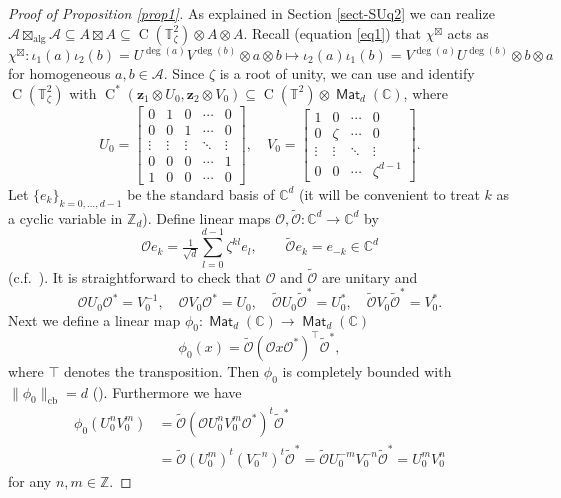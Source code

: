 \documentclass[12pt,reqno,a4paper]{amsart}
\theoremstyle{definition}
\newcommand{\tens}{\otimes}
\newcommand{\algboxtimes}{\boxtimes_{\textrm{alg}}}
\newcommand{\CC}{\mathbb{C}}
\newcommand{\TT}{\mathbb{T}}
\newcommand{\ZZ}{\mathbb{Z}}
\newcommand{\cA}{\mathscr{A}}
\newcommand{\bz}{{\boldsymbol{z}}}
\DeclareMathOperator{\C}{C}
\DeclareMathOperator{\Mat}{\mathsf{Mat}}
\DeclareMathOperator{\cb}{cb}
\numberwithin{equation}{section}
\begin{document}
\begin{appendices}
\begin{proof}[Proof of Proposition \ref{prop1}]
As explained in Section \ref{sect-SUq2} we can realize $\cA\algboxtimes\cA\subseteq A\boxtimes A\subseteq\C(\TT^2_\zeta)\tens A\tens A$. Recall (equation \eqref{eq1}) that $\chi^\boxtimes$ acts as
\[
\chi^\boxtimes\colon\iota_1(a)\iota_2(b)
=U^{\deg(a)}V^{\deg(b)}\tens a\tens b\longmapsto\iota_2(a)\iota_1(b)
=V^{\deg(a)}U^{\deg(b)}\tens b\tens a
\]
for homogeneous $a,b\in\cA$. Since $\zeta$ is a root of unity, we can use \cite[Corollary 1.12]{Boca} and identify $\C(\TT^2_\zeta)$ with $\C^*(\bz_1\tens U_0,\bz_2\tens V_0)\subseteq\C(\TT^2)\tens\Mat_d(\CC)$, where
\[
U_0=\begin{bmatrix}
0 & 1 & 0 & \cdots & 0\\
0 & 0 & 1 & \cdots & 0 \\
\vdots & \vdots & \vdots &
\ddots & \vdots\\
0 & 0 & 0 & \cdots & 1 \\
1 & 0 & 0 & \cdots & 0
\end{bmatrix},\quad
V_0=\begin{bmatrix}
1 & 0 & \cdots & 0\\
0 & \zeta & \cdots & 0 \\
\vdots & \vdots & \ddots & \vdots\\
0 & 0 & \cdots & \zeta^{d-1}
\end{bmatrix}.
\]
Let $\{e_k\}_{k=0,\dotsc,d-1}$ be the standard basis of $\CC^d$ (it will be convenient to treat $k$ as a cyclic variable in $\ZZ_d$). Define linear maps $\mathcal{O},\widetilde{\mathcal{O}}\colon\CC^d\to\CC^d$ by
\[
\mathcal{O}e_k=\tfrac{1}{\sqrt{d}}\sum_{l=0}^{d-1}\zeta^{k l}e_l,\qquad
\widetilde{\mathcal{O}}e_k=e_{-k}\in\CC^d
\]
(c.f.~\cite[Equation (1.11)]{Boca}). It is straightforward to check that $\mathcal{O}$ and $\widetilde{\mathcal{O}}$ are unitary and
\[
\mathcal{O} U_0 \mathcal{O}^*=V_0^{-1},\quad
\mathcal{O}V_0 \mathcal{O}^*=U_0,\quad
\widetilde{\mathcal{O}}U_0\widetilde{\mathcal{O}}^*=U_0^*,\quad
\widetilde{\mathcal{O}}V_0\widetilde{\mathcal{O}}^*=V_0^*.
\]
Next we define a linear map $\phi_0\colon\Mat_d(\CC)\to\Mat_d(\CC)$
\[
\phi_0(x)=\widetilde{\mathcal{O}}(\mathcal{O}x\mathcal{O}^*)^\top
\widetilde{\mathcal{O}}^*,
\]
where $\top$ denotes the transposition. Then $\phi_0$ is completely bounded with $\|\phi_0\|_{\cb}=d$ (\cite[Proposition 2.2.7]{EffrosRuan}). Furthermore we have
\begin{equation}\label{eq4}
\begin{aligned}
\phi_0(U_0^n V_0^m)
&=\widetilde{\mathcal{O}}
(\mathcal{O} U_0^n V_0^m \mathcal{O}^*)^t \widetilde{\mathcal{O}}^*\\
&=\widetilde{\mathcal{O}} (U_0^m)^t (V_0^{-n})^{t} \widetilde{\mathcal{O}}^*
=\widetilde{\mathcal{O}} U_0^{-m} V_0^{-n} \widetilde{\mathcal{O}}^*
=U_0^m V_0^n
\end{aligned}
\end{equation}
for any $n,m\in\ZZ$.


\end{proof}
\end{appendices}
\end{document}

